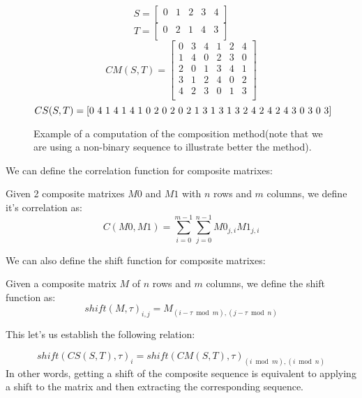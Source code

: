 \begin{figure}[ht!]
  $$S = \begin{bmatrix}
    0 & 1 & 2 & 3 & 4\\
  \end{bmatrix}$$
  $$T = \begin{bmatrix}
    0 & 2 & 1 & 4 & 3 \\
  \end{bmatrix}
  $$
  $$CM(S, T) = \begin{bmatrix}
  0 & 3 & 4 & 1 & 2 & 4\\
  1 & 4 & 0 & 2 & 3 & 0\\
  2 & 0 & 1 & 3 & 4 & 1\\
  3 & 1 & 2 & 4 & 0 & 2\\
  4 & 2 & 3 & 0 & 1 & 3\\
  \end{bmatrix}
  $$
  $$CS(S, T) = \text{[0 4 1 4 1 4 1 0 2 0 2 0 2 1 3 1 3 1 3 2 4 2 4 2 4 3 0 3 0 3]}\\
  $$
  \caption{Example of a computation of the composition method(note that we are
  using a non-binary sequence to illustrate better the method).}
  \label{}
\end{figure}

We can define the correlation function for composite matrixes:

\begin{definition}
  Given 2 composite matrixes $M0$ and $M1$ with $n$ rows and $m$ columns,
  we define it's correlation as:
  \begin{equation}
    C(M0, M1) = \sum_{i=0}^{m-1}\sum_{j=0}^{n-1}M0_{j, i}M1_{j,i}
  \end{equation}
\end{definition}

We can also define the shift function for composite matrixes:

\begin{definition}
  Given a composite matrix $M$ of $n$ rows and $m$ columns, we define the
  shift function as:
  \begin{equation}
    shift(M, \tau)_{i, j} = M_{(i-\tau \bmod m), (j-\tau \bmod n)}
  \end{equation}
\end{definition}
This let's us establish the following relation:
  \begin{corollary}
    \begin{equation}
      shift(CS(S, T), \tau)_{i} = shift(CM(S, T), \tau)_{(i \bmod m), (i \bmod n)}
    \end{equation}
  In other words, getting a shift of the composite sequence is equivalent to
  applying a shift to the matrix and then extracting the corresponding
  sequence.
  \end{corollary}


